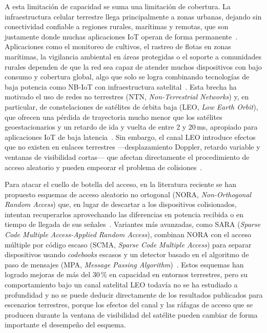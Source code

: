 A esta limitación de capacidad se suma una limitación de cobertura. La infraestructura
celular terrestre llega principalmente a zonas urbanas, dejando sin conectividad confiable
a regiones rurales, marítimas y remotas, que son justamente donde muchas aplicaciones IoT
operan de forma permanente~\cite{ref3}. Aplicaciones como el monitoreo de cultivos, el
rastreo de flotas en zonas marítimas, la vigilancia ambiental en áreas protegidas o el
soporte a comunidades rurales dependen de que la red sea capaz de atender muchos
dispositivos con bajo consumo y cobertura global, algo que solo se logra combinando
tecnologías de baja potencia como NB-IoT con infraestructura satelital~\cite{ref3, ref7}.
Esta brecha ha motivado el uso de redes no terrestres (NTN, \textit{Non-Terrestrial
Networks}) y, en particular, de constelaciones de satélites de órbita baja (LEO,
\textit{Low Earth Orbit}), que ofrecen una pérdida de trayectoria mucho menor que los
satélites geoestacionarios y un retardo de ida y vuelta de entre 2 y 20\,ms, apropiado
para aplicaciones IoT de baja latencia~\cite{ref3, ref8}. Sin embargo, el canal LEO
introduce efectos que no existen en enlaces terrestres ---desplazamiento Doppler, retardo
variable y ventanas de visibilidad cortas--- que afectan directamente el procedimiento de
acceso aleatorio y pueden empeorar el problema de colisiones~\cite{ref8, ref7}.

Para atacar el cuello de botella del acceso, en la literatura reciente se han propuesto
esquemas de acceso aleatorio no ortogonal (NORA, \textit{Non-Orthogonal Random Access}) que,
en lugar de descartar a los dispositivos colisionados, intentan recuperarlos aprovechando
las diferencias en potencia recibida o en tiempo de llegada de sus
señales~\cite{ref5, ref6}. Variantes más avanzadas, como SARA
(\textit{Sparse Code Multiple Access-Applied Random Access}), combinan NORA con el acceso
múltiple por código escaso (SCMA, \textit{Sparse Code Multiple Access}) para separar
dispositivos usando \textit{codebooks} escasos y un detector basado en el algoritmo de paso
de mensajes (MPA, \textit{Message Passing Algorithm})~\cite{ref9, ref10}.
Estos esquemas han logrado mejoras de más del 30\,\% en capacidad en entornos terrestres,
pero su comportamiento bajo un canal satelital LEO todavía no se ha estudiado a profundidad
y no se puede deducir directamente de los resultados publicados para escenarios terrestres,
porque los efectos del canal y las ráfagas de acceso que se producen durante la ventana de
visibilidad del satélite pueden cambiar de forma importante el desempeño del esquema.

